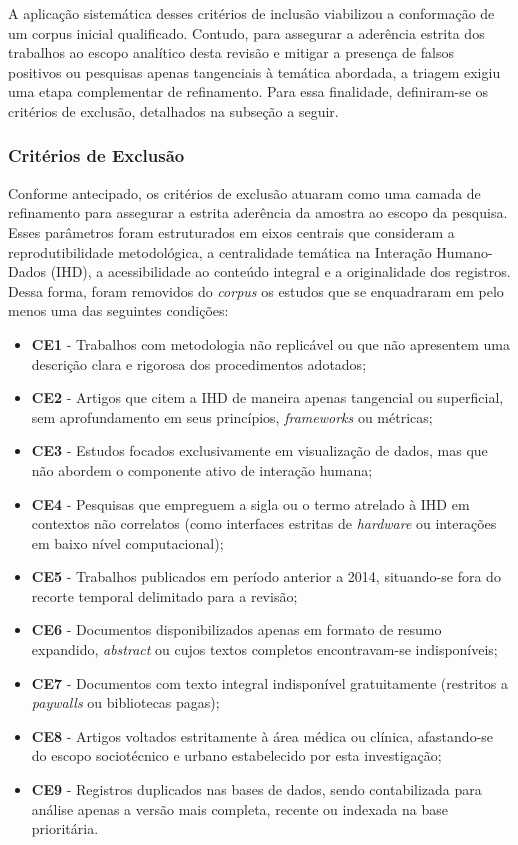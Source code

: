 \documentclass[
	12pt,				%
	oneside,			%
	a4paper,			%
	english,			%
	brazil				%
	]{abntex2ppgsi}
\begin{document}
    A aplicação sistemática desses critérios de inclusão viabilizou a conformação de um corpus inicial qualificado. Contudo, para assegurar a aderência estrita dos trabalhos ao escopo analítico desta revisão e mitigar a presença de falsos positivos ou pesquisas apenas tangenciais à temática abordada, a triagem exigiu uma etapa complementar de refinamento. Para essa finalidade, definiram-se os critérios de exclusão, detalhados na subseção a seguir.
    
\subsubsection{Critérios de Exclusão}
\label{crit:exclu}

    Conforme antecipado, os critérios de exclusão atuaram como uma camada de refinamento para assegurar a estrita aderência da amostra ao escopo da pesquisa. Esses parâmetros foram estruturados em eixos centrais que consideram a reprodutibilidade metodológica, a centralidade temática na Interação Humano-Dados (IHD), a acessibilidade ao conteúdo integral e a originalidade dos registros. Dessa forma, foram removidos do \textit{corpus} os estudos que se enquadraram em pelo menos uma das seguintes condições:

\begin{itemize}
    \item[] \textbf{CE1} - Trabalhos com metodologia não replicável ou que não apresentem uma descrição clara e rigorosa dos procedimentos adotados;
    \item[] \textbf{CE2} - Artigos que citem a IHD de maneira apenas tangencial ou superficial, sem aprofundamento em seus princípios, \textit{frameworks} ou métricas;
    \item[] \textbf{CE3} - Estudos focados exclusivamente em visualização de dados, mas que não abordem o componente ativo de interação humana;
    \item[] \textbf{CE4} - Pesquisas que empreguem a sigla ou o termo atrelado à IHD em contextos não correlatos (como interfaces estritas de \textit{hardware} ou interações em baixo nível computacional);
    \item[] \textbf{CE5} - Trabalhos publicados em período anterior a 2014, situando-se fora do recorte temporal delimitado para a revisão;
    \item[] \textbf{CE6} - Documentos disponibilizados apenas em formato de resumo expandido, \textit{abstract} ou cujos textos completos encontravam-se indisponíveis;
    \item[] \textbf{CE7} - Documentos com texto integral indisponível gratuitamente (restritos a \textit{paywalls} ou bibliotecas pagas);
    \item[] \textbf{CE8} - Artigos voltados estritamente à área médica ou clínica, afastando-se do escopo sociotécnico e urbano estabelecido por esta investigação;
    \item[] \textbf{CE9} - Registros duplicados nas bases de dados, sendo contabilizada para análise apenas a versão mais completa, recente ou indexada na base prioritária.
\end{itemize}
\end{document}
